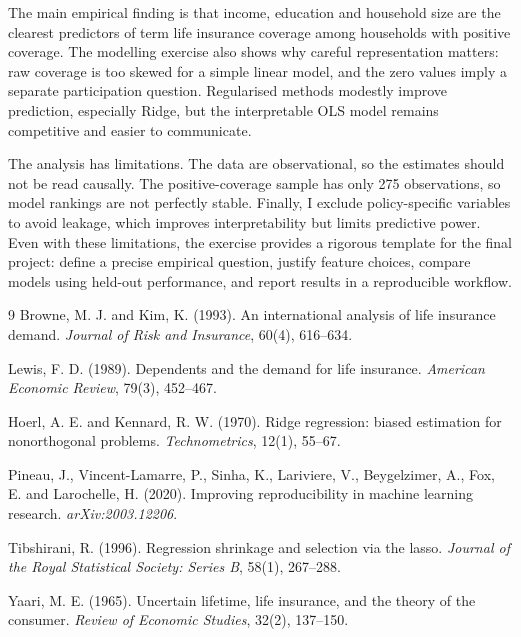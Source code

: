 \documentclass[10pt,a4paper]{article}
\begin{document}
The main empirical finding is that income, education and household size are the clearest predictors of term life insurance coverage among households with positive coverage. The modelling exercise also shows why careful representation matters: raw coverage is too skewed for a simple linear model, and the zero values imply a separate participation question. Regularised methods modestly improve prediction, especially Ridge, but the interpretable OLS model remains competitive and easier to communicate.

The analysis has limitations. The data are observational, so the estimates should not be read causally. The positive-coverage sample has only 275 observations, so model rankings are not perfectly stable. Finally, I exclude policy-specific variables to avoid leakage, which improves interpretability but limits predictive power. Even with these limitations, the exercise provides a rigorous template for the final project: define a precise empirical question, justify feature choices, compare models using held-out performance, and report results in a reproducible workflow.

\small
\begin{thebibliography}{9}
Browne, M. J. and Kim, K. (1993).
An international analysis of life insurance demand.
\emph{Journal of Risk and Insurance}, 60(4), 616--634.

Lewis, F. D. (1989).
Dependents and the demand for life insurance.
\emph{American Economic Review}, 79(3), 452--467.

Hoerl, A. E. and Kennard, R. W. (1970).
Ridge regression: biased estimation for nonorthogonal problems.
\emph{Technometrics}, 12(1), 55--67.

Pineau, J., Vincent-Lamarre, P., Sinha, K., Lariviere, V., Beygelzimer, A., Fox, E. and Larochelle, H. (2020).
Improving reproducibility in machine learning research.
\emph{arXiv:2003.12206}.

Tibshirani, R. (1996).
Regression shrinkage and selection via the lasso.
\emph{Journal of the Royal Statistical Society: Series B}, 58(1), 267--288.

Yaari, M. E. (1965).
Uncertain lifetime, life insurance, and the theory of the consumer.
\emph{Review of Economic Studies}, 32(2), 137--150.
\end{thebibliography}
\end{document}
